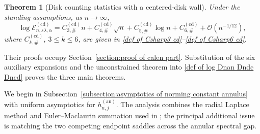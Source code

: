 \documentclass[a4paper]{article}
\newtheorem{theorem}{Theorem}[section]
\numberwithin{equation}{section}
\begin{document}
\begin{theorem}[Disk counting statistics with a centered-disk wall]
\label{theorem:counting statistics of centered disk case}
Under the standing assumptions, as $n\to\infty$,
\[
\log \mathcal{E}_{n,s\lambda,\alpha}^{(\mathrm{cd})}
=C_{3,\#}^{(\mathrm{cd})}n
+C_{4,\#}^{(\mathrm{cd})}\sqrt n
+C_{5,\#}^{(\mathrm{cd})}\log n
+C_{6,\#}^{(\mathrm{cd})}
+\mathcal{O}(n^{-1/12}),
\]
where $C_{k,\#}^{(\mathrm{cd})}$, $3\leq k\leq6$, are given in
\eqref{def of Csharp3 cd}--\eqref{def of Csharp6 cd}.

\end{theorem}
Their proofs occupy Section~\ref{section:proof of calen part}.  Substitution
of the six auxiliary expansions and the unconstrained theorem into
\eqref{def of log Dnan Dndc Dncd} proves the three main theorems.

We begin in Subsection~\ref{subsection:asymptotics of norming constant annulus}
with uniform asymptotics for $h_{n,j}^{(\mathrm{an})}$.  The analysis combines
the radial Laplace method and Euler--Maclaurin summation used in
\cite{BKS2023,ACC2023c,Seo,C2021}; the principal additional issue is matching
the two competing endpoint saddles across the annular spectral gap.
\end{document}

